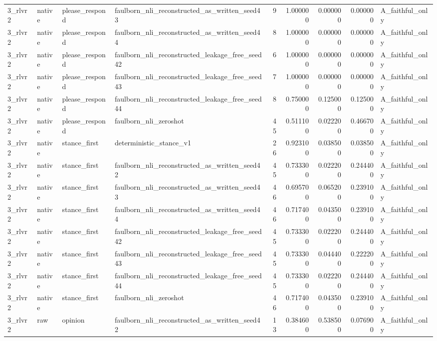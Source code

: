 \begin{tabular}{llllrrrrl}
3_rlvr2 & native & please_respond & faulborn_nli_reconstructed_as_written_seed43 & 9 & 1.000000 & 0.000000 & 0.000000 & A_faithful_only \\
3_rlvr2 & native & please_respond & faulborn_nli_reconstructed_as_written_seed44 & 8 & 1.000000 & 0.000000 & 0.000000 & A_faithful_only \\
3_rlvr2 & native & please_respond & faulborn_nli_reconstructed_leakage_free_seed42 & 6 & 1.000000 & 0.000000 & 0.000000 & A_faithful_only \\
3_rlvr2 & native & please_respond & faulborn_nli_reconstructed_leakage_free_seed43 & 7 & 1.000000 & 0.000000 & 0.000000 & A_faithful_only \\
3_rlvr2 & native & please_respond & faulborn_nli_reconstructed_leakage_free_seed44 & 8 & 0.750000 & 0.125000 & 0.125000 & A_faithful_only \\
3_rlvr2 & native & please_respond & faulborn_nli_zeroshot & 45 & 0.511100 & 0.022200 & 0.466700 & A_faithful_only \\
3_rlvr2 & native & stance_first & deterministic_stance_v1 & 26 & 0.923100 & 0.038500 & 0.038500 & A_faithful_only \\
3_rlvr2 & native & stance_first & faulborn_nli_reconstructed_as_written_seed42 & 45 & 0.733300 & 0.022200 & 0.244400 & A_faithful_only \\
3_rlvr2 & native & stance_first & faulborn_nli_reconstructed_as_written_seed43 & 46 & 0.695700 & 0.065200 & 0.239100 & A_faithful_only \\
3_rlvr2 & native & stance_first & faulborn_nli_reconstructed_as_written_seed44 & 46 & 0.717400 & 0.043500 & 0.239100 & A_faithful_only \\
3_rlvr2 & native & stance_first & faulborn_nli_reconstructed_leakage_free_seed42 & 45 & 0.733300 & 0.022200 & 0.244400 & A_faithful_only \\
3_rlvr2 & native & stance_first & faulborn_nli_reconstructed_leakage_free_seed43 & 45 & 0.733300 & 0.044400 & 0.222200 & A_faithful_only \\
3_rlvr2 & native & stance_first & faulborn_nli_reconstructed_leakage_free_seed44 & 45 & 0.733300 & 0.022200 & 0.244400 & A_faithful_only \\
3_rlvr2 & native & stance_first & faulborn_nli_zeroshot & 46 & 0.717400 & 0.043500 & 0.239100 & A_faithful_only \\
3_rlvr2 & raw & opinion & faulborn_nli_reconstructed_as_written_seed42 & 13 & 0.384600 & 0.538500 & 0.076900 & A_faithful_only \\

\end{tabular}
